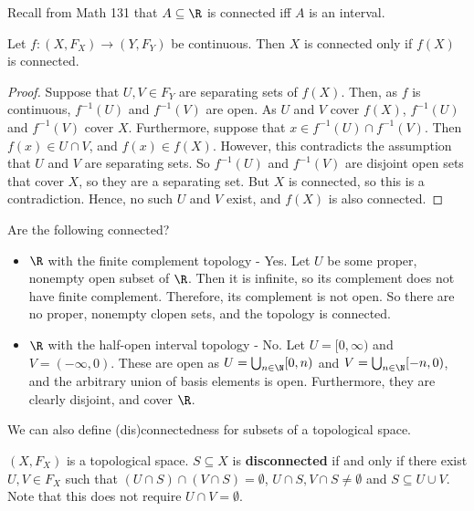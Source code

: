 Recall from Math 131 that $A \subseteq \R$ is connected iff $A$ is an interval.

\begin{theorem}
Let $f : (X,F_X) \to (Y,F_Y)$ be continuous.  Then $X$ is connected only if $f(X)$ is connected.
\end{theorem}
\begin{proof}
Suppose that $U,V \in F_Y$ are separating sets of $f(X)$.  Then, as $f$ is continuous, $f^{-1}(U)$ and $f^{-1}(V)$ are open.  As $U$ and $V$ cover $f(X)$, $f^{-1}(U)$ and $f^{-1}(V)$ cover $X$.  Furthermore, suppose that $x \in f^{-1}(U) \cap f^{-1}(V)$.  Then $f(x) \in U \cap V$, and $f(x) \in f(X)$.  However, this contradicts the assumption that $U$ and $V$ are separating sets.  So $f^{-1}(U)$ and $f^{-1}(V)$ are disjoint open sets that cover $X$, so they are a separating set.  But $X$ is connected, so this is a contradiction.  Hence, no such $U$ and $V$ exist, and $f(X)$ is also connected.
\end{proof}

Are the following connected?
\begin{itemize}
\item $\R$ with the finite complement topology - Yes.  Let $U$ be some proper, nonempty open subset of $\R$.  Then it is infinite, so its complement does not have finite complement.  Therefore, its complement is not open.  So there are no proper, nonempty clopen sets, and the topology is connected.
\item $\R$ with the half-open interval topology - No.  Let $U = [0,\infty)$ and $V = (-\infty,0)$.  These are open as $U = \bigcup_{n\in \N} [0,n)$ and $V = \bigcup_{n \in \N} [-n,0)$, and the arbitrary union of basis elements is open.  Furthermore, they are clearly disjoint, and cover $\R$.
\end{itemize}

We can also define (dis)connectedness for subsets of a topological space.
\begin{definition}
$(X,F_X)$ is a topological space.  $S \subseteq X$ is \textbf{disconnected} if and only if there exist $U,V \in F_X$ such that $(U \cap S) \cap (V \cap S) = \emptyset$, $U \cap S, V \cap S \neq \emptyset$ and $S \subseteq U \cup V$.  Note that this does not require $U \cap V = \emptyset$.
\end{definition}

